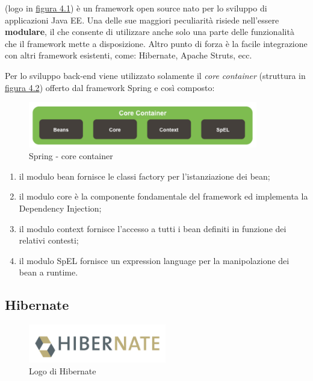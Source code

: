 \ap{{[b]}} (logo in {\hyperref[fig:spring]{figura 4.1}}) è un framework open source nato per lo sviluppo di applicazioni Java EE. Una delle sue maggiori peculiarità risiede nell'essere \textbf{modulare}, il che consente di utilizzare anche solo una parte delle funzionalità che il framework mette a disposizione. Altro punto di forza è la facile integrazione con altri framework esistenti, come: Hibernate, Apache Struts, ecc. 

\setlength{\parskip}{3ex}

\noindent Per lo sviluppo back-end viene utilizzato solamente il  \textit{core container} (struttura in {\hyperref[fig:coreSpring]{figura 4.2}}) offerto dal framework Spring e così composto:

\begin{figure}[!h]
	\centering
	\includegraphics[width=10cm]{../images/Spring-core.png}
	\caption{Spring - core container}
	\label{fig:coreSpring}
\end{figure}

\begin{enumerate}
\item il modulo bean fornisce le classi factory per l’istanziazione dei bean;
\item il modulo core è la componente fondamentale del framework ed implementa la Dependency Injection;
\item il modulo context fornisce l’accesso a tutti i bean definiti in funzione dei relativi contesti;
\item il modulo SpEL fornisce un expression language per la manipolazione dei bean a runtime.
\end{enumerate}

\pagebreak

\subsection{Hibernate}

\begin{figure}[!h]
	\centering
	\includegraphics[width=6cm]{../images/Hibernate-logo.png}
	\caption{Logo di Hibernate}
	\label{fig:hibernate}
\end{figure}

